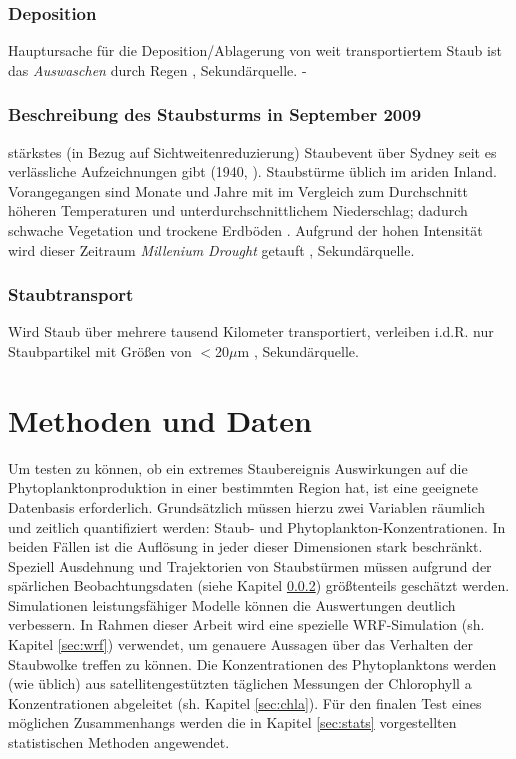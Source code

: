 \documentclass[12pt,a4paper,onecolumn]{scrartcl}
\begin{document}
\subsubsection{Deposition}
Hauptursache für die Deposition/Ablagerung von weit transportiertem Staub ist das \textit{Auswaschen} durch Regen \citep{Marx.2018}, Sekundärquelle. -


\subsubsection{Beschreibung des Staubsturms in September 2009} \label{sec:reddawn}
stärkstes (in Bezug auf Sichtweitenreduzierung) Staubevent über Sydney seit es verlässliche Aufzeichnungen gibt (1940, \citet{Leys.2011}). Staubstürme üblich im ariden Inland. Vorangegangen sind Monate und Jahre mit im Vergleich zum Durchschnitt höheren Temperaturen und unterdurchschnittlichem Niederschlag; dadurch schwache Vegetation und trockene Erdböden \citep{Leys.2011}. Aufgrund der hohen Intensität wird dieser Zeitraum \textit{Millenium Drought} getauft \citep{Deckker.2014}, Sekundärquelle.

\subsubsection{Staubtransport}
Wird Staub über mehrere tausend Kilometer transportiert, verleiben i.d.R. nur Staubpartikel mit Größen von $<$20$\mu$m \citep{Marx.2018}, Sekundärquelle.

\section{Methoden und Daten} \label{sec:Methoden}
Um testen zu können, ob ein extremes Staubereignis Auswirkungen auf die Phytoplanktonproduktion in einer bestimmten Region hat, ist eine geeignete Datenbasis erforderlich. Grundsätzlich müssen hierzu zwei Variablen räumlich und zeitlich quantifiziert werden: Staub- und Phytoplankton-Konzentrationen. In beiden Fällen ist die Auflösung in jeder dieser Dimensionen stark beschränkt. Speziell Ausdehnung und Trajektorien von Staubstürmen müssen aufgrund der spärlichen Beobachtungsdaten (siehe Kapitel  \ref{sec:reddawn}) größtenteils geschätzt werden. Simulationen leistungsfähiger Modelle können die Auswertungen deutlich verbessern. In Rahmen dieser Arbeit wird eine spezielle WRF-Simulation (sh. Kapitel \ref{sec:wrf}) verwendet, um genauere Aussagen über das Verhalten der Staubwolke treffen zu können. Die Konzentrationen des Phytoplanktons werden (wie üblich) aus satellitengestützten täglichen Messungen der Chlorophyll a Konzentrationen abgeleitet (sh. Kapitel \ref{sec:chla}). Für den finalen Test eines möglichen Zusammenhangs werden die in Kapitel \ref{sec:stats} vorgestellten statistischen Methoden angewendet.
\end{document}
